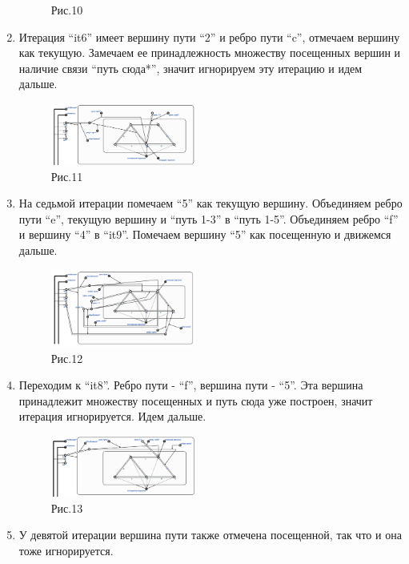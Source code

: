 \documentclass[10pt,a4paper,twocolumn]{article}
\begin{document}
\begin{enumerate}
\begin{figure}[h]
		\caption{Рис.10}
	\end{figure}
	\item Итерация ``it6'' имеет вершину пути ``2'' и ребро пути ``c'', отмечаем вершину как текущую. Замечаем ее принадлежность множеству посещенных вершин и наличие связи ``путь сюда*'', значит игнорируем эту итерацию и идем дальше.
    \newpage
	\begin{figure}[h]
		\includegraphics[width=0.45\textwidth]{img/img11.png}
		\caption{Рис.11}
	\end{figure}
	\item На седьмой итерации помечаем ``5'' как текущую вершину. Объединяем ребро пути ``e'', текущую вершину и ``путь 1-3'' в ``путь 1-5''. Объединяем ребро ``f'' и вершину ``4'' в ``it9''. Помечаем вершину ``5'' как посещенную и движемся дальше. 
	\begin{figure}[h]
		\includegraphics[width=0.45\textwidth]{img/img12.png}
		\caption{Рис.12}
	\end{figure}
	\item Переходим к ``it8''. Ребро пути - ``f'', вершина пути - ``5''. Эта вершина принадлежит множеству посещенных и путь сюда уже построен, значит итерация игнорируется. Идем дальше.
	\begin{figure}[h]
		\includegraphics[width=0.45\textwidth]{img/img13.png}
		\caption{Рис.13}
	\end{figure}
	\item У девятой итерации вершина пути также отмечена посещенной, так что и она тоже игнорируется.
    \newpage
	\begin{figure}[h]

\end{figure}
\end{enumerate}
\end{document}
